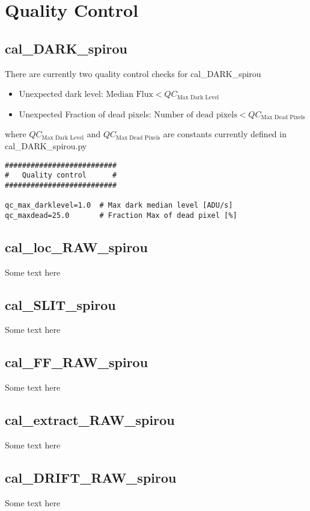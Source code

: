  \chapter{Quality Control}


\section{cal\_DARK\_spirou}
\label{section:qc_cal_DARK_spirou}

There are currently two quality control checks for cal\_DARK\_spirou
\begin{itemize}
\item Unexpected dark level: $\text{Median Flux} < QC_{\text{Max Dark Level}}$
\item Unexpected Fraction of dead pixels: $\text{Number of dead pixels} < QC_{\text{Max Dead Pixels}}$
\end{itemize}

\noindent where $QC_{\text{Max Dark Level}}$ and $QC_{\text{Max Dead Pixels}}$ are constants currently defined in cal\_DARK\_spirou.py

\begin{lstlisting}[style=pythonstyle]
##########################
#   Quality control      #
##########################

qc_max_darklevel=1.0  # Max dark median level [ADU/s]  
qc_maxdead=25.0       # Fraction Max of dead pixel [%]
\end{lstlisting}

\section{cal\_loc\_RAW\_spirou}
\label{section:qc_cal_loc_RAW_spirou}

Some text here

\section{cal\_SLIT\_spirou}
\label{section:qc_cal_SLIT_spirou}

Some text here

\section{cal\_FF\_RAW\_spirou}
\label{section:qc_cal_FF_RAW_spirou}

Some text here

\section{cal\_extract\_RAW\_spirou}
\label{section:qc_cal_extract_RAW_spirou}

Some text here

\section{cal\_DRIFT\_RAW\_spirou}
\label{section:qc_cal_DRIFT_RAW_spirou}

Some text here
